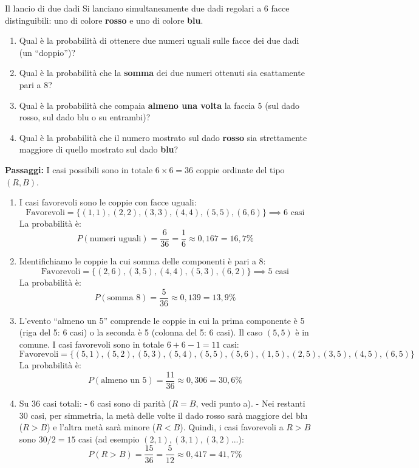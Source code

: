 \begin{esercizio}{Il lancio di due dadi}
Si lanciano simultaneamente due dadi regolari a $6$ facce distinguibili: uno di colore \textbf{rosso} e uno di colore \textbf{blu}.

\begin{enumerate}[label=\alph*)]
  \item Qual è la probabilità di ottenere due numeri uguali sulle facce dei due dadi (un ``doppio'')?
  \item Qual è la probabilità che la \textbf{somma} dei due numeri ottenuti sia esattamente pari a $8$?
  \item Qual è la probabilità che compaia \textbf{almeno una volta} la faccia $5$ (sul dado rosso, sul dado blu o su entrambi)?
  \item Qual è la probabilità che il numero mostrato sul dado \textbf{rosso} sia strettamente maggiore di quello mostrato sul dado \textbf{blu}?
\end{enumerate}

\responsespace{3.0cm}

\begin{soluzione}
  \textbf{Passaggi:}
  I casi possibili sono in totale $6 \times 6 = 36$ coppie ordinate del tipo $(R, B)$.
  \begin{enumerate}[label=\alph*)]
    \item I casi favorevoli sono le coppie con facce uguali:
    \[
    \text{Favorevoli} = \{(1,1), (2,2), (3,3), (4,4), (5,5), (6,6)\} \implies 6 \text{ casi}
    \]
    La probabilità è:
    \[
    P(\text{numeri uguali}) = \frac{6}{36} = \frac{1}{6} \approx 0{,}167 = 16{,}7\%
    \]
    \item Identifichiamo le coppie la cui somma delle componenti è pari a 8:
    \[
    \text{Favorevoli} = \{(2,6), (3,5), (4,4), (5,3), (6,2)\} \implies 5 \text{ casi}
    \]
    La probabilità è:
    \[
    P(\text{somma } 8) = \frac{5}{36} \approx 0{,}139 = 13{,}9\%
    \]
    \item L'evento ``almeno un 5'' comprende le coppie in cui la prima componente è 5 (riga del 5: 6 casi) o la seconda è 5 (colonna del 5: 6 casi). Il caso $(5,5)$ è in comune.
    I casi favorevoli sono in totale $6 + 6 - 1 = 11$ casi:
    \[
    \text{Favorevoli} = \{(5,1), (5,2), (5,3), (5,4), (5,5), (5,6), (1,5), (2,5), (3,5), (4,5), (6,5)\}
    \]
    La probabilità è:
    \[
    P(\text{almeno un } 5) = \frac{11}{36} \approx 0{,}306 = 30{,}6\%
    \]
    \item Su 36 casi totali:
    - 6 casi sono di parità ($R = B$, vedi punto a).
    - Nei restanti $30$ casi, per simmetria, la metà delle volte il dado rosso sarà maggiore del blu ($R > B$) e l'altra metà sarà minore ($R < B$).
    Quindi, i casi favorevoli a $R > B$ sono $30 / 2 = 15$ casi (ad esempio $(2,1), (3,1), (3,2)...$):
    \[
    P(R > B) = \frac{15}{36} = \frac{5}{12} \approx 0{,}417 = 41{,}7\%
    \]
  \end{enumerate}
\end{soluzione}
\end{esercizio}

